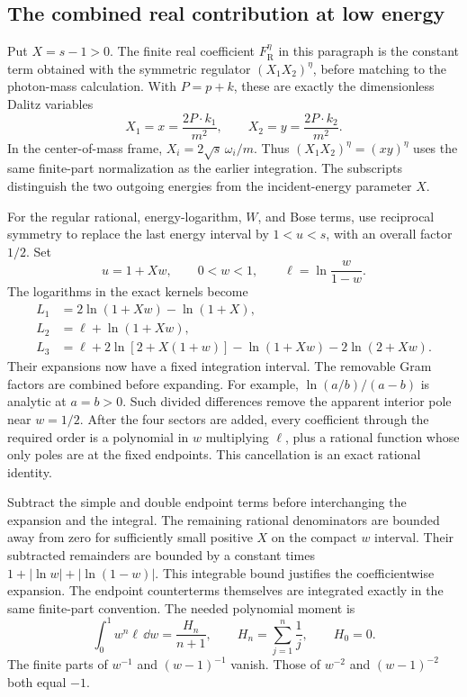 \subsection{The combined real contribution at low energy}
Put $X=s-1>0$. The finite real coefficient $F_{\mathrm R}^{\eta}$
in this paragraph is the constant term obtained with the symmetric
regulator $(X_1X_2)^\eta$, before matching to the photon-mass
calculation. With $P=p+k$, these are exactly the dimensionless
Dalitz variables
\begin{equation}
 X_1=x=\frac{2P\cdot k_1}{m^2},\qquad
 X_2=y=\frac{2P\cdot k_2}{m^2}.
\end{equation}
In the center-of-mass frame, $X_i=2\sqrt{s}\,\omega_i/m$.
Thus $(X_1X_2)^\eta=(xy)^\eta$ uses the same finite-part
normalization as the earlier integration. The subscripts distinguish
the two outgoing energies from the incident-energy parameter $X$.

For the regular rational, energy-logarithm, $W$, and Bose terms,
use reciprocal symmetry to replace the last energy interval by
$1<u<s$, with an overall factor $1/2$. Set
\begin{equation}
 u=1+Xw,\qquad 0<w<1,\qquad
 \ell=\ln\frac{w}{1-w}.
\end{equation}
The logarithms in the exact kernels become
\begin{align}
 L_1&=2\ln(1+Xw)-\ln(1+X),\\
 L_2&=\ell+\ln(1+Xw),\\
 L_3&=\ell+2\ln[2+X(1+w)]-\ln(1+Xw)-2\ln(2+Xw).
\end{align}
Their expansions now have a fixed integration interval. The
removable Gram factors are combined before expanding. For example,
$\ln(a/b)/(a-b)$ is analytic at $a=b>0$. Such divided differences
remove the apparent interior pole near $w=1/2$.
After the four sectors are added, every coefficient through the
required order is a polynomial in $w$ multiplying $\ell$, plus a
rational function whose only poles are at the fixed endpoints.
This cancellation is an exact rational identity.

Subtract the simple and double endpoint terms before interchanging
the expansion and the integral. The remaining rational
denominators are bounded away from zero for sufficiently small
positive $X$ on the compact $w$ interval. Their subtracted
remainders are bounded by a constant times
$1+|\ln w|+|\ln(1-w)|$. This integrable bound justifies the
coefficientwise expansion. The endpoint counterterms themselves
are integrated exactly in the same finite-part convention.
The needed polynomial moment is
\begin{equation}
 \int_0^1w^n\ell\,\dd w=\frac{H_n}{n+1},\qquad
 H_n=\sum_{j=1}^{n}\frac1j,\qquad H_0=0.
\end{equation}
The finite parts of $w^{-1}$ and $(w-1)^{-1}$ vanish. Those of
$w^{-2}$ and $(w-1)^{-2}$ both equal $-1$.

